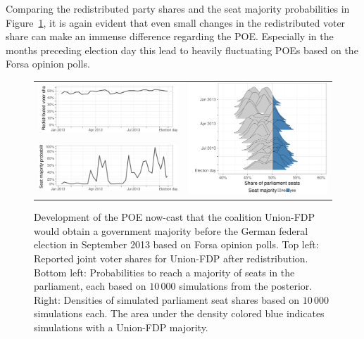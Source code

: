 \documentclass[smallcondensed]{svjour3}     %
\begin{document}
Comparing the redistributed party shares and the seat majority probabilities
in Figure~\ref{fig:seatDist_time}, it is again evident that even small changes
in the redistributed voter share can make an immense difference regarding the
POE. Especially in the months preceding election day this lead to heavily
fluctuating POEs based on the Forsa opinion polls. \\


\begin{figure}[H]\centering
\begin{tabular}{ll}
\includegraphics[height=.15\textwidth]{figures/2013_forsa_cdufdp_rawSharesRedist.pdf}
&
\multirow{2}{*}[13ex]{\includegraphics[height=30ex]{figures/2013_forsa_cdufdp_ridgeline.pdf}}
\\
\includegraphics[height=.15\textwidth]{figures/2013_forsa_cdufdp_prob.pdf}
\end{tabular}
\caption{Development of the POE now-cast that the coalition Union-FDP would obtain
a government majority before the German federal election in September 2013 based
on Forsa opinion polls.
Top left: Reported joint voter shares for Union-FDP after redistribution.
Bottom left: Probabilities to reach a majority of seats in the parliament, each
based on $10\,000$ simulations from the posterior.
Right: Densities of simulated parliament seat shares based on $10\,000$ simulations each.
The area under the density colored blue indicates simulations with a Union-FDP majority.
\label{fig:seatDist_time}
}
\end{figure}
\end{document}
